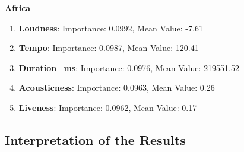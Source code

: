 \textbf{Africa}
\begin{enumerate}
    \item \textbf{Loudness}: Importance: 0.0992, Mean Value: -7.61
    \item \textbf{Tempo}: Importance: 0.0987, Mean Value: 120.41
    \item \textbf{Duration\_ms}: Importance: 0.0976, Mean Value: 219551.52
    \item \textbf{Acousticness}: Importance: 0.0963, Mean Value: 0.26
    \item \textbf{Liveness}: Importance: 0.0962, Mean Value: 0.17
\end{enumerate}

\subsection{Interpretation of the Results}
